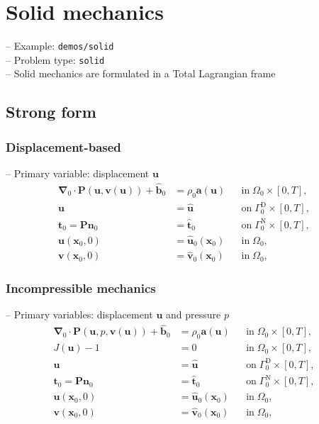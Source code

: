 \documentclass[a4paper,12pt]{report}
\newcommand{\bs}[1]{\boldsymbol{#1}}
\newcommand{\Om}{\mathit{\Omega}}
\newcommand{\Gm}{\mathit{\Gamma}}
\begin{document}
\section{Solid mechanics}\label{sec:solid}

-- Example: \verb.demos/solid.\\

-- Problem type: \verb.solid.\\

-- Solid mechanics are formulated in a Total Lagrangian frame

\subsection{Strong form}

\subsubsection{Displacement-based}
-- Primary variable: displacement $\bs{u}$
\begin{align}
\bs{\nabla}_{0} \cdot \bs{P}(\bs{u},\bs{v}(\bs{u})) + \hat{\bs{b}}_{0} &= \rho_{0} \bs{a}(\bs{u}) &&\text{in} \; \mathit{\Omega}_{0} \times [0, T], \label{eq:divP} \\
\bs{u} &= \hat{\bs{u}} &&\text{on} \; \mathit{\Gamma}_{0}^{\mathrm{D}} \times [0, T], \label{eq:bc_u}\\
\bs{t}_{0} = \bs{P}\bs{n}_{0} &= \hat{\bs{t}}_{0} &&\text{on} \; \mathit{\Gamma}_{0}^{\mathrm{N}} \times [0, T], \label{eq:bc_N}\\
\bs{u}(\bs{x}_{0},0) &= \hat{\bs{u}}_{0}(\bs{x}_{0}) &&\text{in} \; \mathit{\Omega}_{0}, \label{eq:ini_u}\\
\bs{v}(\bs{x}_{0},0) &= \hat{\bs{v}}_{0}(\bs{x}_{0}) &&\text{in} \; \mathit{\Omega}_{0}, \label{eq:ini_v}
\end{align}

\subsubsection{Incompressible mechanics}
-- Primary variables: displacement $\bs{u}$ and pressure $p$
\begin{align}
\bs{\nabla}_{0} \cdot \bs{P}(\bs{u},p,\bs{v}(\bs{u})) + \hat{\bs{b}}_{0} &= \rho_{0} \bs{a}(\bs{u}) &&\text{in} \; \mathit{\Omega}_{0} \times [0, T], \label{eq:divP_inc} \\
J(\bs{u})-1 &= 0 &&\text{in} \; \mathit{\Omega}_{0} \times [0, T], \label{eq:J} \\
\bs{u} &= \hat{\bs{u}} &&\text{on} \; \mathit{\Gamma}_{0}^{\mathrm{D}} \times [0, T], \label{eq:bc_u_inc}\\
\bs{t}_{0} = \bs{P}\bs{n}_{0} &= \hat{\bs{t}}_{0} &&\text{on} \; \mathit{\Gm}_{0}^{\mathrm{N}} \times [0, T], \label{eq:bc_N_inc}\\
\bs{u}(\bs{x}_{0},0) &= \hat{\bs{u}}_{0}(\bs{x}_{0}) &&\text{in} \; \mathit{\Om}_{0}, \label{eq:ini_u_inc}\\
\bs{v}(\bs{x}_{0},0) &= \hat{\bs{v}}_{0}(\bs{x}_{0}) &&\text{in} \; \mathit{\Om}_{0}, \label{eq:ini_v_inc}
\end{align}
\end{document}
